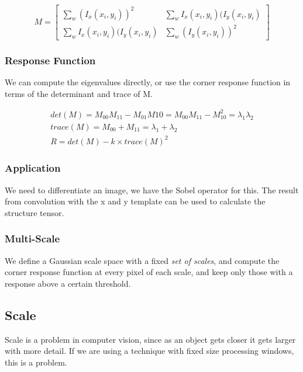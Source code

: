 \begin{equation}
    M = \begin{bmatrix} \sum_{w} (I_{x}(x_{i},y_{i}))^2 & \sum_{w} I_{x}(x_{i},y_{i})(I_{y}(x_{i},y_{i}) \\[0.2cm] \sum_{w} I_{x}(x_{i},y_{i})(I_{y}(x_{i},y_{i}) & \sum_{w} (I_{y}(x_{i},y_{i}))^2  \end{bmatrix}
\end{equation}

\subsubsection{Response Function}

We can compute the eigenvalues directly, or use the corner response function in terms of the determinant and trace of M.

\begin{align}
    det(M) = M_{00}M_{11} - M_{01}M{10} = M_{00}M_{11}-M_{10}^2 = \lambda_{1}\lambda_{2} \\
    trace(M) = M_{00}+M_{11} = \lambda_{1}+\lambda_{2} \\
    R = det(M) - k\times trace(M)^2
\end{align}

\subsubsection{Application}

We need to differentiate an image, we have the Sobel operator for this. The result from convolution with the x and y template can be used to calculate the structure tensor.

\subsubsection{Multi-Scale}

We define a Gaussian scale space with a fixed \textit{set of scales}, and compute the corner response function at every pixel of each scale, and keep only those with a response above a certain threshold.
\subsection{Scale}

Scale is a problem in computer vision, since as an object gets closer it gets larger with more detail. If we are using a technique with fixed size processing windows, this is a problem.

